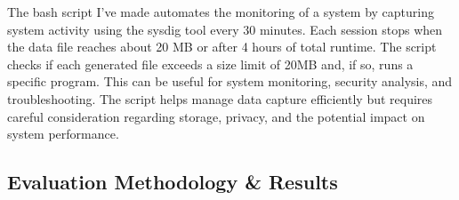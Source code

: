 The bash script I've made automates the monitoring of a system by capturing system activity using the sysdig tool every 30 minutes. Each session stops when the data file reaches about 20 MB or after 4 hours of total runtime. The script checks if each generated file exceeds a size limit of 20MB and, if so, runs a specific program. This can be useful for system monitoring, security analysis, and troubleshooting. The script helps manage data capture efficiently but requires careful consideration regarding storage, privacy, and the potential impact on system performance.

\subsection{Evaluation Methodology \& Results}

